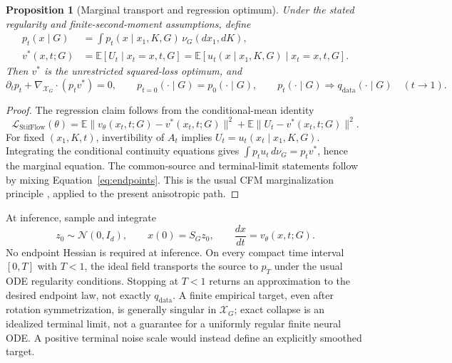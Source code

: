 \documentclass[11pt,letterpaper]{article}
\newcommand{\E}{\mathbb E}
\newcommand{\X}{\mathcal X_G}
\newtheorem{proposition}{Proposition}
\begin{document}
\begin{proposition}[Marginal transport and regression optimum]\label{prop:transport}
Under the stated regularity and finite-second-moment assumptions, define
\begin{equation}\label{eq:marginal}
\begin{aligned}
p_t(x\mid G)&=\int p_t(x\mid x_1,K,G)\,\nu_G(dx_1,dK),\\
v^*(x,t;G)&=\E[U_t\mid x_t=x,t,G]
=\E[u_t(x\mid x_1,K,G)\mid x_t=x,t,G].
\end{aligned}
\end{equation}
Then $v^*$ is the unrestricted squared-loss optimum, and
\begin{equation}\label{eq:marginalcontinuity}
\partial_t p_t+\nabla_{\X}\!\cdot(p_t v^*)=0,\qquad
p_{t=0}(\cdot\mid G)=p_0(\cdot\mid G),\qquad
p_t(\cdot\mid G)\Rightarrow q_{\mathrm{data}}(\cdot\mid G)\quad(t\to1).
\end{equation}
\end{proposition}
\begin{proof}
The regression claim follows from the conditional-mean identity
\begin{equation}\label{eq:lossdecomp}
\mathcal L_{\mathrm{StifFlow}}(\theta)=
\E\|v_\theta(x_t,t;G)-v^*(x_t,t;G)\|^2
+\E\|U_t-v^*(x_t,t;G)\|^2.
\end{equation}
For fixed $(x_1,K,t)$, invertibility of $A_t$ implies $U_t=u_t(x_t\mid x_1,K,G)$. Integrating the conditional continuity equations gives
$\int p_tu_t\,d\nu_G=p_t v^*$, hence the marginal equation. The common-source and terminal-limit statements follow by mixing Equation~\eqref{eq:endpoints}. This is the usual CFM marginalization principle \cite{lipman}, applied to the present anisotropic path.
\end{proof}

At inference, sample and integrate
\begin{equation}\label{eq:inference}
z_0\sim\mathcal N(0,I_d),\qquad x(0)=S_Gz_0,\qquad
\frac{dx}{dt}=v_\theta(x,t;G).
\end{equation}
No endpoint Hessian is required at inference. On every compact time interval $[0,T]$ with $T<1$, the ideal field transports the source to $p_T$ under the usual ODE regularity conditions. Stopping at $T<1$ returns an approximation to the desired endpoint law, not exactly $q_{\mathrm{data}}$. A finite empirical target, even after rotation symmetrization, is generally singular in $\X$; exact collapse is an idealized terminal limit, not a guarantee for a uniformly regular finite neural ODE. A positive terminal noise scale would instead define an explicitly smoothed target.
\end{document}
